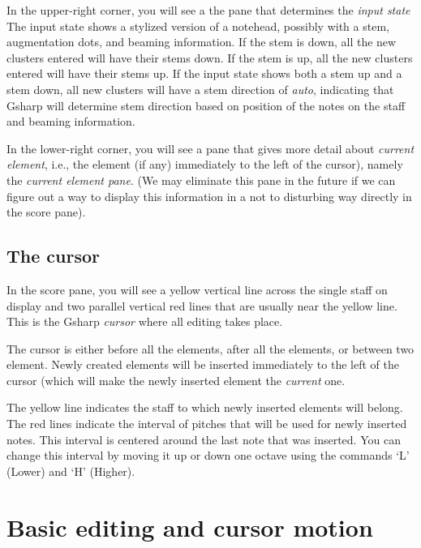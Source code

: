 \documentclass[11pt]{book}
\def\gs{Gsharp}
\def\kbd#1{`#1'}
\begin{document}
In the upper-right corner, you will see a the pane that determines the
\emph{input state}
The input state shows a stylized version of a notehead, possibly with
a stem, augmentation dots, and beaming information.  If the stem is
down, all the new clusters entered will have their stems down.  If the
stem is up, all the new clusters entered will have their stems up.  If
the input state shows both a stem up and a stem down, all new
clusters will have a stem direction of \emph{auto}, indicating that
{\gs} will determine stem direction based on position of the notes on
the staff and beaming information. 

In the lower-right corner, you will see a pane that gives more detail
about \emph{current element}, i.e., the element (if any)
immediately to the left of the cursor), namely the \emph{current
  element pane}. (We may eliminate this pane in the
future if we can figure out a way to display this information in a not
to disturbing way directly in the score pane).

\section{The cursor}

In the score pane, you will see a yellow vertical line across the
single staff on display and two parallel vertical red lines that are
usually near the yellow line.  This is the {\gs}
\emph{cursor} where all editing takes place.

The cursor is either before all the elements, after all the elements,
or between two element.  Newly created elements will be inserted
immediately to the left of the cursor (which will make the newly
inserted element the \emph{current} one. 

The yellow line indicates the staff to which newly inserted elements
will belong.  The red lines indicate the interval of pitches that will
be used for newly inserted notes.  This interval is centered around
the last note that was inserted.  You can change this interval by
moving it up or down one octave using the commands \kbd{L} (Lower) and
\kbd{H} (Higher). 

\chapter{Basic editing and cursor motion}
\end{document}
